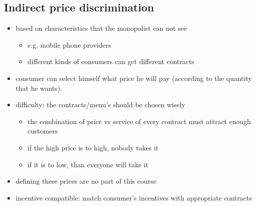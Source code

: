 \documentclass[12pt, a4paper, titlepage]{extarticle}
\begin{document}
	\subsection{Indirect price discrimination}
	\begin{itemize}
	\item based on characteristics that the monopolist can not see
    	\begin{itemize}
    	\item e.g. mobile phone providers
    	\item different kinds of consumers can get different contracts
    	\end{itemize}
	\item consumer can select himself what price he will pay (according to the quantity that he wants).
    \item difficulty: the contracts/menu's should be chosen wisely
        \begin{itemize}
        \item the combination of price vs service of every contract must attract enough customers
        \item if the high price is to high, nobody takes it
        \item if it is to low, than everyone will take it
        \end{itemize}
	\item defining these prices are no part of this course
	\item incentive compatible: match consumer's incentives with appropriate contracts 
	\end{itemize}
	
\end{document}
